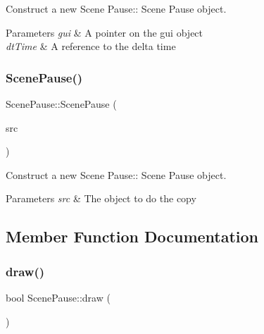 Construct a new Scene Pause\+:\+: Scene Pause object. 


\begin{DoxyParams}{Parameters}
{\em gui} & A pointer on the gui object \\
\hline
{\em dt\+Time} & A reference to the delta time \\
\hline
\end{DoxyParams}
\mbox{\label{class_scene_pause_ab29265b4f3e3c8cfd7fd2e0ba116daab}} 
\subsubsection{\texorpdfstring{Scene\+Pause()}{ScenePause()}\hspace{0.1cm}{\footnotesize\ttfamily [2/2]}}
{\footnotesize\ttfamily Scene\+Pause\+::\+Scene\+Pause (\begin{DoxyParamCaption}\item[{\hyperlink{class_scene_pause}{Scene\+Pause} const \&}]{src }\end{DoxyParamCaption})}



Construct a new Scene Pause\+:\+: Scene Pause object. 


\begin{DoxyParams}{Parameters}
{\em src} & The object to do the copy \\
\hline
\end{DoxyParams}


\subsection{Member Function Documentation}
\mbox{\label{class_scene_pause_aa59d21ea311bab5163574441f3960734}} 
\subsubsection{\texorpdfstring{draw()}{draw()}}
{\footnotesize\ttfamily bool Scene\+Pause\+::draw (\begin{DoxyParamCaption}{ }\end{DoxyParamCaption})\hspace{0.3cm}{\ttfamily [virtual]}}



